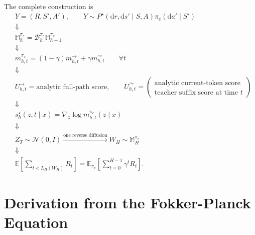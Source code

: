 \documentclass[11pt]{article}
\theoremstyle{definition}
\theoremstyle{remark}
\newcommand{\Normal}{\mathcal N}
\newcommand{\E}{\mathbb E}
\newcommand{\dd}{\mathrm d}
\newcommand{\score}{s}
\newcommand{\Bell}{\mathcal B}
\newcommand{\targetpi}{\pi_e}
\newcommand{\branchstop}{\rightarrow}
\newcommand{\branchcont}{\curvearrowright}
\begin{document}
The complete construction is
\begin{equation}
\boxed{
\begin{aligned}
&Y=(R,S',A'),
\qquad
Y\sim P^\star(\dd r,\dd s'\mid S,A)
\targetpi(\dd a'\mid S')
\\[1mm]
&\Downarrow
\\[-1mm]
&\mathbb M_h^{\targetpi}
=
\Bell_h^{\targetpi}\mathbb M_{h-1}^{\targetpi}
\\[1mm]
&\Downarrow
\\[-1mm]
&m_{h,t}^{\targetpi}
=
(1-\gamma)m_{h,t}^{\branchstop}
+
\gamma m_{h,t}^{\branchcont}
\qquad\forall t
\\[1mm]
&\Downarrow
\\[-1mm]
&U_{h,t}^{\branchstop}
=
\text{analytic full-path score},
\qquad
U_{h,t}^{\branchcont}
=
\begin{pmatrix}
\text{analytic current-token score}
\\
\text{teacher suffix score at time }t
\end{pmatrix}
\\[1mm]
&\Downarrow
\\[-1mm]
&\score_h^\star(z,t\mid x)
=
\nabla_z\log m_{h,t}^{\targetpi}(z\mid x)
\\[1mm]
&\Downarrow
\\[-1mm]
&Z_T\sim\Normal(0,I)
\xrightarrow{\text{one reverse diffusion}}
W_H\sim\mathbb M_H^{\targetpi}
\\[1mm]
&\Downarrow
\\[-1mm]
&\E\left[\sum_{t<L_H(W_H)}R_t\right]
=
\E_{\targetpi}\left[\sum_{t=0}^{H-1}\gamma^tR_t\right].
\end{aligned}
}
\label{eq:complete-chain}
\end{equation}

\appendix

\section{Derivation from the Fokker-Planck Equation}
\label{app:fokker-planck}
\end{document}
